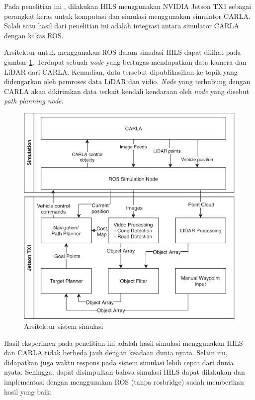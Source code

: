 Pada penelitian ini \parencite{brogle_CarlaHILS}, dilakukan HILS menggunakan
NVIDIA Jetson TX1 sebagai perangkat keras untuk komputasi dan simulasi
menggunakan simulator CARLA. Salah satu hasil dari penelitian ini adalah
integrasi antara simulator CARLA dengan kakas ROS.

Arsitektur untuk menggunakan ROS dalam simulasi HILS dapat dilihat pada gambar
\ref{chapter-2-carla-jetson-arch}. Terdapat sebuah \textit{node}  yang
bertugas mendapatkan data kamera dan LiDAR dari CARLA. Kemudian, data tersebut
dipublikasikan ke topik yang didengarkan oleh pemroses data LiDAR dan vidio.
\textit{Node} yang terhubung dengan CARLA akan dikirimkan data terkait kendali
kendaraan oleh \textit{node} yang disebut \textit{path planning node}.

\begin{figure}
    \centering
    \includegraphics[width=1.0\textwidth]{resources/chapter-2/carla-jetson-arch.png}
    \caption{Arsitektur sistem simulasi \parencite{brogle_CarlaHILS}}
    \label{chapter-2-carla-jetson-arch}
\end{figure}

Hasil eksperimen pada penelitian ini adalah hasil simulasi menggunakan HILS dan
CARLA tidak berbeda jauh dengan keadaan dunia nyata. Selain itu, didapatkan juga
waktu respons pada sistem simulasi lebih cepat dari dunia nyata. Sehingga, dapat
disimpulkan bahwa simulasi HILS dapat dilakukan dan implementasi dengan
menggunakan ROS (tanpa rosbridge) sudah memberikan hasil yang baik.
